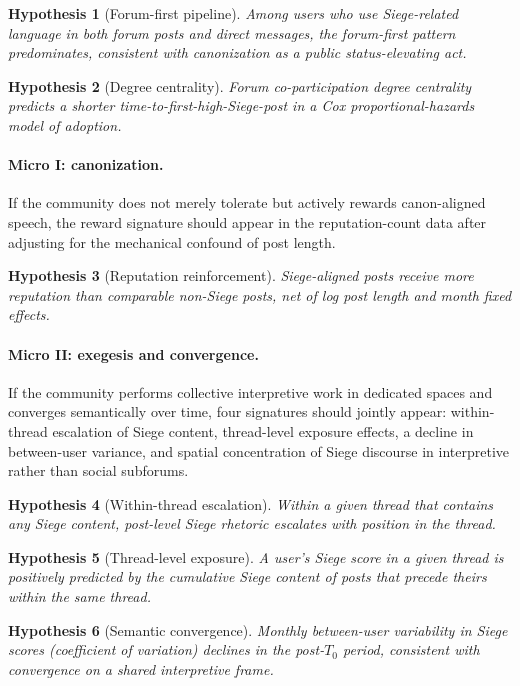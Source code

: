 \documentclass[bibtex,autowc,nonblind]{apsr_submission}
\newtheorem{hyp}{Hypothesis}
\begin{document}
\begin{hyp}[Forum-first pipeline]
Among users who use Siege-related language in both forum posts and direct messages, the forum-first pattern predominates, consistent with canonization as a public status-elevating act.
\end{hyp}

\begin{hyp}[Degree centrality]
Forum co-participation degree centrality predicts a shorter time-to-first-high-Siege-post in a Cox proportional-hazards model of adoption.
\end{hyp}

\paragraph{Micro I: canonization.} If the community does not merely tolerate but actively rewards canon-aligned speech, the reward signature should appear in the reputation-count data after adjusting for the mechanical confound of post length.

\begin{hyp}[Reputation reinforcement]
Siege-aligned posts receive more reputation than comparable non-Siege posts, net of log post length and month fixed effects.
\end{hyp}

\paragraph{Micro II: exegesis and convergence.} If the community performs collective interpretive work in dedicated spaces and converges semantically over time, four signatures should jointly appear: within-thread escalation of Siege content, thread-level exposure effects, a decline in between-user variance, and spatial concentration of Siege discourse in interpretive rather than social subforums.

\begin{hyp}[Within-thread escalation]
Within a given thread that contains any Siege content, post-level Siege rhetoric escalates with position in the thread.
\end{hyp}

\begin{hyp}[Thread-level exposure]
A user's Siege score in a given thread is positively predicted by the cumulative Siege content of posts that precede theirs within the same thread.
\end{hyp}

\begin{hyp}[Semantic convergence]
Monthly between-user variability in Siege scores (coefficient of variation) declines in the post-$T_0$ period, consistent with convergence on a shared interpretive frame.
\end{hyp}
\end{document}

